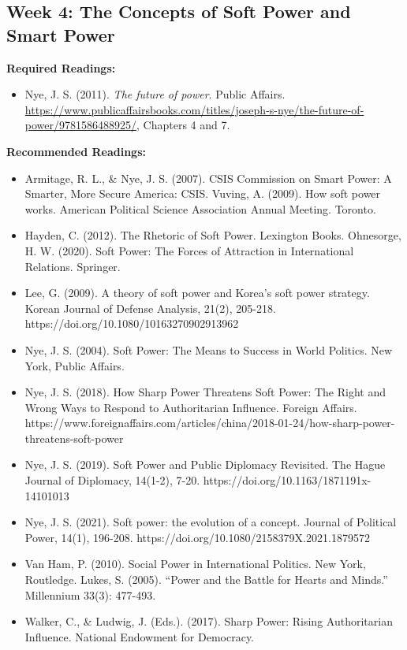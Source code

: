 \documentclass[
  letterpaper,
  DIV=11,
  numbers=noendperiod]{scrartcl}
\providecommand{\tightlist}{%
  \setlength{\itemsep}{0pt}\setlength{\parskip}{0pt}}\usepackage{longtable,booktabs,array}
\begin{document}
\hypertarget{week-4-the-concepts-of-soft-power-and-smart-power}{%
\subsection*{Week 4: The Concepts of Soft Power and Smart
Power}\label{week-4-the-concepts-of-soft-power-and-smart-power}}

\textbf{Required Readings:}

\begin{itemize}
\tightlist
\item
  Nye, J. S. (2011). \emph{The future of power}. Public Affairs.
  \url{https://www.publicaffairsbooks.com/titles/joseph-s-nye/the-future-of-power/9781586488925/},
  Chapters 4 and 7.
\end{itemize}

\textbf{Recommended Readings:}

\begin{itemize}
\item
  Armitage, R. L., \& Nye, J. S. (2007). CSIS Commission on Smart Power:
  A Smarter, More Secure America: CSIS. Vuving, A. (2009). How soft
  power works. American Political Science Association Annual Meeting.
  Toronto.
\item
  Hayden, C. (2012). The Rhetoric of Soft Power. Lexington Books.
  Ohnesorge, H. W. (2020). Soft Power: The Forces of Attraction in
  International Relations. Springer.
\item
  Lee, G. (2009). A theory of soft power and Korea's soft power
  strategy. Korean Journal of Defense Analysis, 21(2), 205-218.
  https://doi.org/10.1080/10163270902913962
\item
  Nye, J. S. (2004). Soft Power: The Means to Success in World Politics.
  New York, Public Affairs.
\item
  Nye, J. S. (2018). How Sharp Power Threatens Soft Power: The Right and
  Wrong Ways to Respond to Authoritarian Influence. Foreign Affairs.
  https://www.foreignaffairs.com/articles/china/2018-01-24/how-sharp-power-threatens-soft-power
\item
  Nye, J. S. (2019). Soft Power and Public Diplomacy Revisited. The
  Hague Journal of Diplomacy, 14(1-2), 7-20.
  https://doi.org/10.1163/1871191x-14101013
\item
  Nye, J. S. (2021). Soft power: the evolution of a concept. Journal of
  Political Power, 14(1), 196-208.
  https://doi.org/10.1080/2158379X.2021.1879572
\item
  Van Ham, P. (2010). Social Power in International Politics. New York,
  Routledge. Lukes, S. (2005). ``Power and the Battle for Hearts and
  Minds.'' Millennium 33(3): 477-493.
\item
  Walker, C., \& Ludwig, J. (Eds.). (2017). Sharp Power: Rising
  Authoritarian Influence. National Endowment for Democracy.
\end{itemize}
\end{document}
